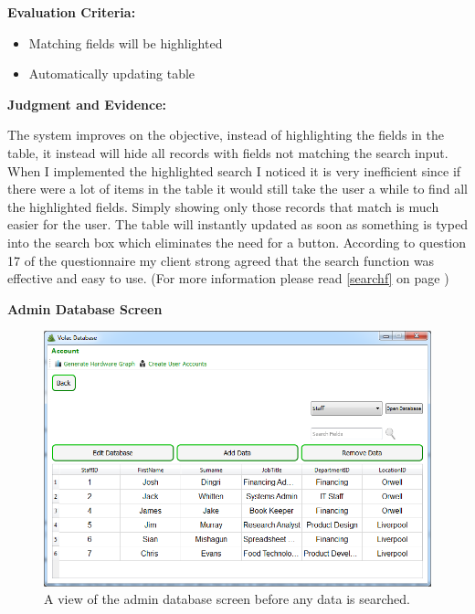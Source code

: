 \textbf{Evaluation Criteria:}
\begin{itemize}
\item{Matching fields will be highlighted}
\item{Automatically updating table}
\end{itemize}

\textbf{Judgment and Evidence:}

The system improves on the objective, instead of highlighting the fields in the table, it instead will hide all records with fields not matching the search input. When I implemented the highlighted search I noticed it is very inefficient since if there were a lot of items in the table it would still take the user a while to find all the highlighted fields. Simply showing only those records that match is much easier for the user. The table will instantly updated as soon as something is typed into the search box which eliminates the need for a button. According to question 17 of the questionnaire my client strong agreed that the search function was effective and easy to use. (For more information please read \ref{searchf} on page \pageref{searchf})

\textbf{Admin Database Screen}

\begin{figure}[H]
    \includegraphics[width=\textwidth]{./Evaluation/Images/beforeadminsearch.png}
    \caption{A view of the admin database screen before any data is searched.} 
\end{figure}


